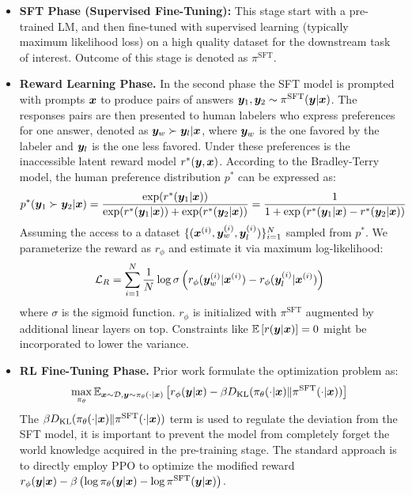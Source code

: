 \documentclass{article} %
\begin{document}
\begin{itemize}
    \item \textbf{SFT Phase (Supervised Fine-Tuning):} This stage start with a pre-trained LM, and then fine-tuned with supervised learning (typically maximum likelihood loss) on a high quality dataset for the downstream task of interest. Outcome of this stage is denoted as $\pi^{\text{SFT}}$.
    \item \textbf{Reward Learning Phase.} In the second phase the SFT model is prompted with prompts ${\bm{x}}$ to produce pairs of answers ${\bm{y}}_1,{\bm{y}}_2\sim \pi^{\text{SFT}}({\bm{y}}|{\bm{x}})$. The responses pairs are then presented to human labelers who express preferences for one answer, denoted as ${\bm{y}}_w \succ {\bm{y}}_l |{\bm{x}}$, where ${\bm{y}}_w$ is the one favored by the labeler and ${\bm{y}}_l$ is the one less favored. Under these preferences is the inaccessible latent reward model $r^*({\bm{y}},{\bm{x}})$. According to the Bradley-Terry \citep{bradley1952rank} model, the human preference distribution $p^*$ can be expressed as:
    \begin{align*}
        p^*({\bm{y}}_1\succ{\bm{y}}_2|{\bm{x}}) &= \frac{\exp(r^*({\bm{y}}_1|{\bm{x}}))}{\exp(r^*({\bm{y}}_1|{\bm{x}}))+\exp(r^*({\bm{y}}_2|{\bm{x}}))} = \frac{1}{1+\exp\left(r^*({\bm{y}}_1|{\bm{x}})-r^*({\bm{y}}_2|{\bm{x}})\right)}
    \end{align*}
    Assuming the access to a dataset $\{({\bm{x}}^{(i)},{\bm{y}}^{(i)}_w,{\bm{y}}^{(i)}_l)\}_{i=1}^N$ sampled from $p^*$. We parameterize the reward as $r_\phi$ and estimate it via maximum log-likelihood:
    \begin{equation}\mathcal{L}_R = \sum_{i=1}^N \frac{1}{N} \log \sigma\left(r_\phi({\bm{y}}^{(i)}_w|{\bm{x}}^{(i)})-r_\phi({\bm{y}}^{(i)}_l|{\bm{x}}^{(i)})\right)\label{equation:rm}\end{equation}
    where $\sigma$ is the sigmoid function. $r_\phi$ is initialized with $\pi^{\text{SFT}}$ augmented by additional linear layers on top. Constraints like $\mathbb{E}\left[r({\bm{y}}|{\bm{x}})\right] = 0$ might be incorporated to lower the variance.
    \item \textbf{RL Fine-Tuning Phase.} Prior work formulate the optimization problem as:
    \begin{equation}\max_{\pi_\theta}\mathbb{E}_{{\bm{x}}\sim \mathcal{D}, {\bm{y}}\sim \pi_\theta(\cdot|{\bm{x}})}\left[r_\phi({\bm{y}}|{\bm{x}})-\beta D_{\mathrm{KL}}(\pi_\theta(\cdot|{\bm{x}})\Vert \pi^{\text{SFT}}(\cdot|{\bm{x}}))\right]\label{equation:rl_reward}\end{equation}
    The $\beta D_{\mathrm{KL}}(\pi_\theta(\cdot|{\bm{x}})\Vert \pi^{\text{SFT}}(\cdot|{\bm{x}}))$ term is used to regulate the deviation from the SFT model, it is important to prevent the model from completely forget the world knowledge acquired in the pre-training stage. The standard approach is to directly employ PPO \citep{schulman2017proximal, ouyang2022training} to optimize the modified reward $r_\phi({\bm{y}}|{\bm{x}})-\beta\left(\log\pi_\theta({\bm{y}}|{\bm{x}})-\log \pi^{\text{SFT}}({\bm{y}}|{\bm{x}})\right)$.
\end{itemize}
\end{document}
